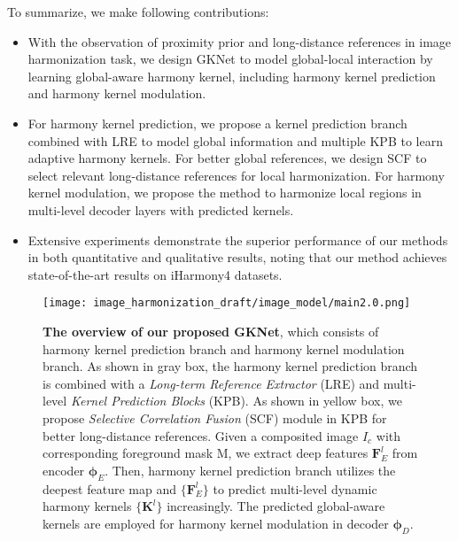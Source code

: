 \documentclass[10pt,twocolumn,letterpaper]{article}
\begin{document}
To summarize, we make following contributions: 
\begin{itemize}[leftmargin=*]
\vspace{-2pt}
\item With the observation of proximity prior and long-distance references in image harmonization task, we design GKNet to model global-local interaction by learning global-aware harmony kernel, including harmony kernel prediction and harmony kernel modulation.
\vspace{-4pt}
\item For harmony kernel prediction, we propose a kernel prediction branch combined with LRE to model global information and multiple KPB to learn adaptive harmony kernels. For better global references, we design SCF to select relevant long-distance references for local harmonization. For harmony kernel modulation, we propose the method to harmonize local regions in multi-level decoder layers with predicted kernels.
\vspace{-4pt}

\item Extensive experiments demonstrate the superior performance of our methods in both quantitative and qualitative results, noting that our method achieves state-of-the-art results on iHarmony4 datasets.

\end{itemize}

\begin{figure*}[t]
  \centering
  \texttt{[image: image\_harmonization\_draft/image\_model/main2.0.png]}
  \caption{{\bf The overview of our proposed GKNet}, which consists of harmony kernel prediction branch and harmony kernel modulation branch. As shown in gray box, the harmony kernel prediction branch is combined with a \emph{Long-term Reference Extractor} (LRE) and multi-level \emph{Kernel Prediction Blocks} (KPB). As shown in yellow box, we propose \emph{Selective Correlation Fusion} (SCF) module in KPB for better long-distance references. Given a composited image $I_c$ with corresponding foreground mask M, we extract deep features ${\mathbf{F}_E^l}$ from encoder $\boldsymbol\phi_E$. Then, harmony kernel prediction branch utilizes the deepest feature map and $\{\mathbf{F}_E^l\}$ to predict multi-level dynamic harmony kernels $\{\mathbf{K}^l\}$ increasingly. The predicted global-aware kernels are employed for harmony kernel modulation in decoder $\boldsymbol\phi_D$.}
  \label{fig:main_model}
\end{figure*}
\vspace{-5pt}
\end{document}
